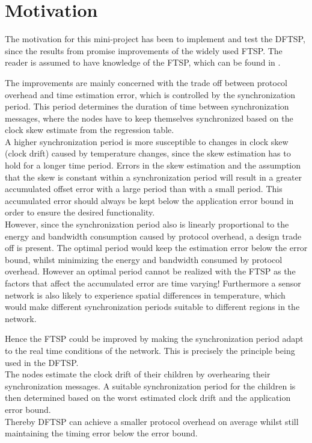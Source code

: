 \documentclass[Main]{subfiles}
\begin{document}
\section{Motivation} %
\label{sec:motivation}

	The motivation for this mini-project has been to implement and test the DFTSP, since the results from \cite{dynamicFTSParticle} promise improvements of the widely used FTSP. 
	The reader is assumed to have knowledge of the FTSP, which can be found in \cite{FTSParticle}. 

	The improvements are mainly concerned with the trade off between protocol overhead and time estimation error, which is controlled by the synchronization period.
	This period determines the duration of time between synchronization messages, where the nodes have to keep themselves synchronized based on the clock skew estimate from the regression table.
	\\A higher synchronization period is more susceptible to changes in clock skew (clock drift) caused by temperature changes, since the skew estimation has to hold for a longer time period. 
	Errors in the skew estimation and the assumption that the skew is constant within a synchronization period will result in a greater accumulated offset error with a large period than with a small period. 
	This accumulated error should always be kept below the application error bound in order to ensure the desired functionality. 
	\\However, since the synchronization period also is linearly proportional to the energy and bandwidth consumption caused by protocol overhead, a design trade off is present.
	The optimal period would keep the estimation error below the error bound, whilst minimizing the energy and bandwidth consumed by protocol overhead.
	However an optimal period cannot be realized with the FTSP as the factors that affect the accumulated error are time varying! 
	Furthermore a sensor network is also likely to experience spatial differences in temperature, which would make different synchronization periods suitable to different regions in the network.

	Hence the FTSP could be improved by making the synchronization period adapt to the real time conditions of the network. 
	This is precisely the principle being used in the DFTSP. 
	\\The nodes estimate the clock drift of their children by overhearing their synchronization messages.
	A suitable synchronization period for the children is then determined based on the worst estimated clock drift and the application error bound.
	\\Thereby DFTSP can achieve a smaller protocol overhead on average whilst still maintaining the timing error below the error bound.  


\end{document}

